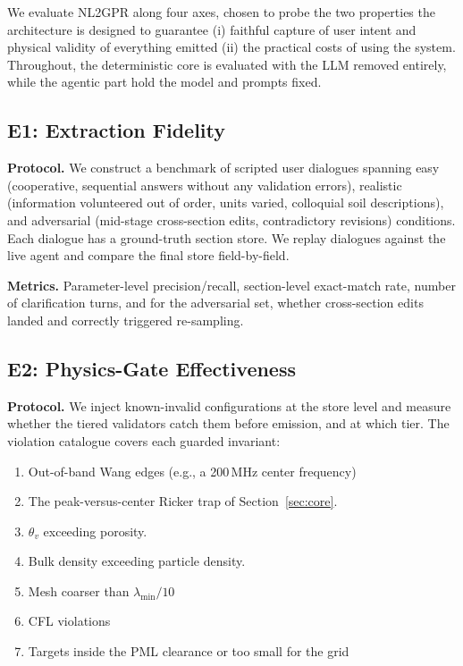 \documentclass[journal]{IEEEtran}
\begin{document}
We evaluate NL2GPR along four axes, chosen to probe the two properties the architecture is designed to guarantee (i) faithful capture of user intent and physical validity of everything emitted (ii) the practical costs of using the system. Throughout, the deterministic core is evaluated with the LLM removed entirely, while the agentic part hold the model and prompts fixed.

\subsection{E1: Extraction Fidelity}
\label{sec:eval-extraction}

\textbf{Protocol.} We construct a benchmark of scripted user dialogues spanning easy (cooperative, sequential answers without any validation errors), realistic (information volunteered out of order, units varied, colloquial soil descriptions), and adversarial (mid-stage cross-section edits, contradictory revisions) conditions. Each dialogue has a ground-truth section store. We replay dialogues against the live agent and compare the final store field-by-field.

\textbf{Metrics.} Parameter-level precision/recall, section-level exact-match rate, number of clarification turns, and for the adversarial set, whether cross-section edits landed and correctly triggered re-sampling.


\subsection{E2: Physics-Gate Effectiveness}
\label{sec:eval-gates}

\textbf{Protocol.} We inject known-invalid configurations at the store level and measure whether the tiered validators catch them before emission, and at which tier. The violation catalogue covers each guarded invariant:

\begin{enumerate}
    \item Out-of-band Wang edges (e.g., a 200\,MHz center frequency)
    \item The peak-versus-center Ricker trap of Section~\ref{sec:core}.
    \item $\theta_v$ exceeding porosity.
    \item Bulk density exceeding particle density.
    \item Mesh coarser than $\lambda_{\min}/10$
    \item CFL violations
    \item Targets inside the PML clearance or too small for the grid
    
    
\end{enumerate}
\end{document}
